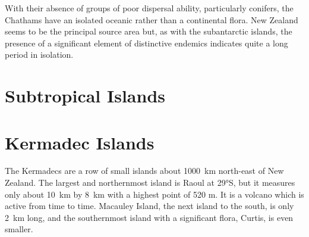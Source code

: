 With their absence of groups of poor dispersal ability, particularly conifers, the Chathams have an isolated oceanic rather than a continental flora.
New Zealand seems to be the principal source area but, as with the subantarctic islands, the presence of a significant element of distinctive endemics indicates quite a long period in isolation.

\section{Subtropical Islands}

\section{Kermadec Islands}

The Kermadecs are a row of small islands about \SI{1000}{\kilo\metre} north-east of New Zealand.
The largest and northernmost island is Raoul at \ang{29}S, but it measures only about \SI{10}{\kilo\metre} by \SI{8}{\kilo\metre} with a highest point of 520 m.
It is a volcano which is active from time to time.
Macauley Island, the next island to the south, is only \SI{2}{\kilo\metre} long, and the southernmost island with a significant flora, Curtis, is even smaller.

